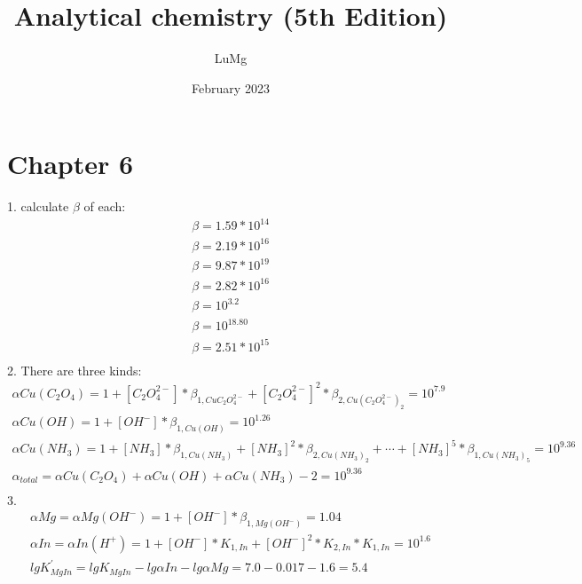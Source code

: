 \documentclass{article}
\title{Analytical chemistry (5th Edition)}
\author{LuMg}
\date{February 2023}
\begin{document}
\maketitle

\section{Chapter 6}
1. calculate $\beta$ of each:\\
\begin{equation}
    \begin{multlined}
    \beta = 1.59*10^{14}\\
    \beta = 2.19*10^{16}\\
    \beta = 9.87*10^{19}\\
    \beta = 2.82*10^{16}\\
    \beta = 10^{3.2}\\
    \beta = 10^{18.80}\\
    \beta = 2.51*10^{15}\\
    \end{multlined}
\end{equation}
2. There are three kinds:\\
\begin{equation}
    \begin{multlined}
        \alpha Cu\left(C_2O_4\right) = 1 + \left[C_2O_4^{2-}\right] * \beta_{1, CuC_2O_4^{2-}} + \left[C_2O_4^{2-}\right]^2 * \beta_{2, Cu\left(C_2O_4^{2-}\right)_2} = 10^{7.9}\\
        \alpha Cu\left(OH\right) = 1 + \left[OH^-\right]*\beta_{1, Cu\left(OH\right)} = 10^{1.26}\\
        \alpha Cu\left(NH_3\right) = 1 + \left[NH_3\right]*\beta_{1, Cu\left(NH_3\right)} + \left[NH_3\right]^2*\beta_{2, Cu\left(NH_3\right)_2} + \cdots + \left[NH_3\right]^5*\beta_{1, Cu\left(NH_3\right)_5} = 10^{9.36}\\
        \alpha_{total} = \alpha Cu\left(C_2O_4\right) + \alpha Cu\left(OH\right) + \alpha Cu\left(NH_3\right) - 2 = 10^{9.36}\\
    \end{multlined}
\end{equation}
3.\begin{equation}
    \begin{multlined}
        \alpha Mg = \alpha Mg\left(OH^-\right) = 1 + \left[OH^-\right] * \beta_{1, Mg\left(OH^-\right)} = 1.04\\
        \alpha In = \alpha In\left(H^+\right) = 1 + \left[OH^-\right] * K_{1, In} + \left[OH^-\right]^2 * K_{2, In} * K_{1, In} = 10^{1.6}\\
        lg K^{'}_{MgIn} = lg K_{MgIn} - lg\alpha In - lg \alpha Mg = 7.0 - 0.017 - 1.6 = 5.4\\
    \end{multlined}
\end{equation}
\end{document}
